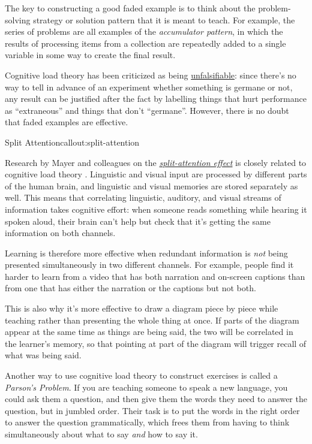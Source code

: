 The key to constructing a good faded example is to think about the
problem-solving strategy or solution pattern that it is meant to
teach.  For example, the series of problems are all examples of the
\emph{accumulator pattern}, in which the results of processing items
from a collection are repeatedly added to a single variable in some way
to create the final result.

Cognitive load theory has been criticized as being
\href{https://edtechdev.wordpress.com/2009/11/16/cognitive-load-theory-failure/}{unfalsifiable}:
since there's no way to tell in advance of an experiment whether
something is germane or not, any result can be justified after the
fact by labelling things that hurt performance as ``extraneous'' and
things that don't ``germane''.  However, there is no doubt that faded
examples are effective.

\begin{callout}{Split Attention}{callout:split-attention}

Research by Mayer and colleagues on the
\emph{\href{https://en.wikipedia.org/wiki/Split\_attention\_effect}{split-attention
effect}} is closely related to cognitive load theory
\cite{bib:mayer-nine-ways}.  Linguistic and visual input are
processed by different parts of the human brain, and linguistic and
visual memories are stored separately as well. This means that
correlating linguistic, auditory, and visual streams of information
takes cognitive effort: when someone reads something while hearing it
spoken aloud, their brain can't help but check that it's getting the
same information on both channels.

Learning is therefore more effective when redundant information is
\emph{not} being presented simultaneously in two different channels. For
example, people find it harder to learn from a video that has both
narration and on-screen captions than from one that has either the
narration or the captions but not both.

This is also why it's more effective to draw a diagram piece by piece
while teaching rather than presenting the whole thing at once.  If
parts of the diagram appear at the same time as things are being said,
the two will be correlated in the learner's memory, so that pointing
at part of the diagram will trigger recall of what was being said.

\end{callout}

Another way to use cognitive load theory to construct exercises is
called a \emph{Parson's Problem}.  If you are teaching someone to
speak a new language, you could ask them a question, and then give
them the words they need to answer the question, but in jumbled
order.  Their task is to put the words in the right order to answer
the question grammatically, which frees them from having to think
simultaneously about what to say \emph{and} how to say it.

